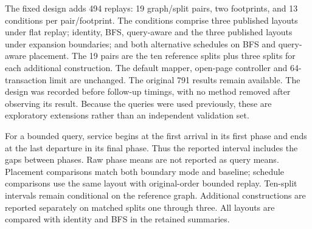 The fixed design adds 494 replays: 19 graph/split pairs, two footprints, and 13 conditions per pair/footprint. The conditions comprise three published layouts under flat replay; identity, BFS, query-aware and the three published layouts under expansion boundaries; and both alternative schedules on BFS and query-aware placement. The 19 pairs are the ten reference splits plus three splits for each additional construction. The default mapper, open-page controller and 64-transaction limit are unchanged. The original 791 results remain available. The design was recorded before follow-up timings, with no method removed after observing its result. Because the queries were used previously, these are exploratory extensions rather than an independent validation set.

For a bounded query, service begins at the first arrival in its first phase and ends at the last departure in its final phase. Thus the reported interval includes the gaps between phases. Raw phase means are not reported as query means. Placement comparisons match both boundary mode and baseline; schedule comparisons use the same layout with original-order bounded replay. Ten-split intervals remain conditional on the reference graph. Additional constructions are reported separately on matched splits one through three. All layouts are compared with identity and BFS in the retained summaries.
